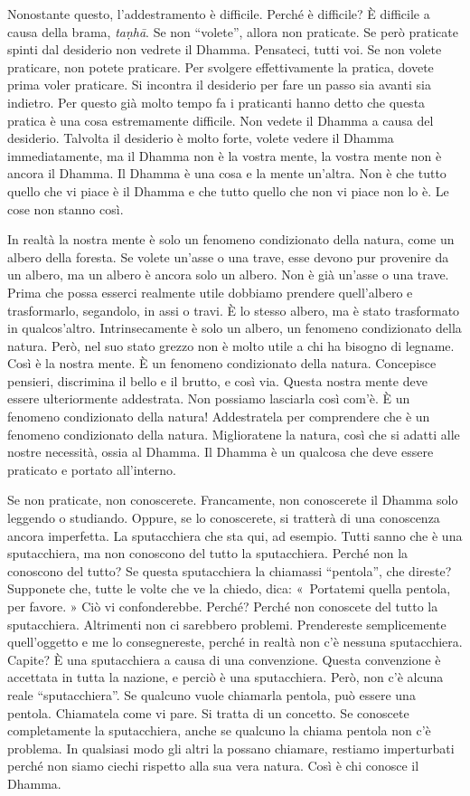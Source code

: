 Nonostante questo, l'addestramento è difficile. Perché è difficile? È
difficile a causa della brama, \emph{taṇhā}. Se non ``volete'', allora
non praticate. Se però praticate spinti dal desiderio non vedrete il
Dhamma. Pensateci, tutti voi. Se non volete praticare, non potete
praticare. Per svolgere effettivamente la pratica, dovete prima voler
praticare. Si incontra il desiderio per fare un passo sia avanti sia
indietro. Per questo già molto tempo fa i praticanti hanno detto che
questa pratica è una cosa estremamente difficile. Non vedete il Dhamma a
causa del desiderio. Talvolta il desiderio è molto forte, volete vedere
il Dhamma immediatamente, ma il Dhamma non è la vostra mente, la vostra
mente non è ancora il Dhamma. Il Dhamma è una cosa e la mente un'altra.
Non è che tutto quello che vi piace è il Dhamma e che tutto quello che
non vi piace non lo è. Le cose non stanno così.

In realtà la nostra mente è solo un fenomeno condizionato della natura,
come un albero della foresta. Se volete un'asse o una trave, esse devono
pur provenire da un albero, ma un albero è ancora solo un albero. Non è
già un'asse o una trave. Prima che possa esserci realmente utile
dobbiamo prendere quell'albero e trasformarlo, segandolo, in assi o
travi. È lo stesso albero, ma è stato trasformato in qualcos'altro.
Intrinsecamente è solo un albero, un fenomeno condizionato della natura.
Però, nel suo stato grezzo non è molto utile a chi ha bisogno di
legname. Così è la nostra mente. È un fenomeno condizionato della
natura. Concepisce pensieri, discrimina il bello e il brutto, e così
via. Questa nostra mente deve essere ulteriormente addestrata. Non
possiamo lasciarla così com'è. È un fenomeno condizionato della natura!
Addestratela per comprendere che è un fenomeno condizionato della
natura. Miglioratene la natura, così che si adatti alle nostre
necessità, ossia al Dhamma. Il Dhamma è un qualcosa che deve essere
praticato e portato all'interno.

Se non praticate, non conoscerete. Francamente, non conoscerete il
Dhamma solo leggendo o studiando. Oppure, se lo conoscerete, si tratterà
di una conoscenza ancora imperfetta. La sputacchiera che sta qui, ad
esempio. Tutti sanno che è una sputacchiera, ma non conoscono del tutto
la sputacchiera. Perché non la conoscono del tutto? Se questa
sputacchiera la chiamassi ``pentola'', che direste? Supponete che, tutte
le volte che ve la chiedo, dica: «~Portatemi quella pentola, per favore.
» Ciò vi confonderebbe. Perché? Perché non conoscete del tutto la
sputacchiera. Altrimenti non ci sarebbero problemi. Prendereste
semplicemente quell'oggetto e me lo consegnereste, perché in realtà non
c'è nessuna sputacchiera. Capite? È una sputacchiera a causa di una
convenzione. Questa convenzione è accettata in tutta la nazione, e
perciò è una sputacchiera. Però, non c'è alcuna reale ``sputacchiera''.
Se qualcuno vuole chiamarla pentola, può essere una pentola. Chiamatela
come vi pare. Si tratta di un concetto. Se conoscete completamente la
sputacchiera, anche se qualcuno la chiama pentola non c'è problema. In
qualsiasi modo gli altri la possano chiamare, restiamo imperturbati
perché non siamo ciechi rispetto alla sua vera natura. Così è chi
conosce il Dhamma.

